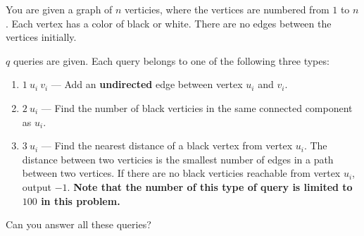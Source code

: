 You are given a graph of $n$ verticies, where the vertices are numbered from $1$ to $n$.
Each vertex has a color of black or white.
There are no edges between the vertices initially.

$q$ queries are given. Each query belongs to one of the following three types:
\begin{enumerate}
    \item $1\ u_i\ v_i$ — Add an \textbf{undirected} edge between vertex $u_i$ and $v_i$.
    \item $2\ u_i$ — Find the number of black verticies in the same connected component as $u_i$.
    \item $3\ u_i$ — Find the nearest distance of a black vertex from vertex $u_i$.
    The distance between two verticies is the smallest number of edges in a path between two vertices.
    If there are no black verticies reachable from vertex $u_i$, output $-1$. 
    \textbf{Note that the number of this type of query is limited to $100$ in this problem.}
\end{enumerate}
Can you answer all these queries?